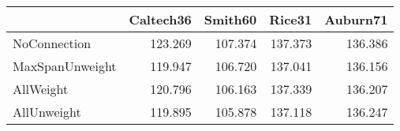 \begin{tabular}{lrrrr}
\toprule
{} & Caltech36 & Smith60 &  Rice31 & Auburn71 \\
\midrule
NoConnection    &   123.269 & 107.374 & 137.373 &  136.386 \\
MaxSpanUnweight &   119.947 & 106.720 & 137.041 &  136.156 \\
AllWeight       &   120.796 & 106.163 & 137.339 &  136.207 \\
AllUnweight     &   119.895 & 105.878 & 137.118 &  136.247 \\
\bottomrule
\end{tabular}
